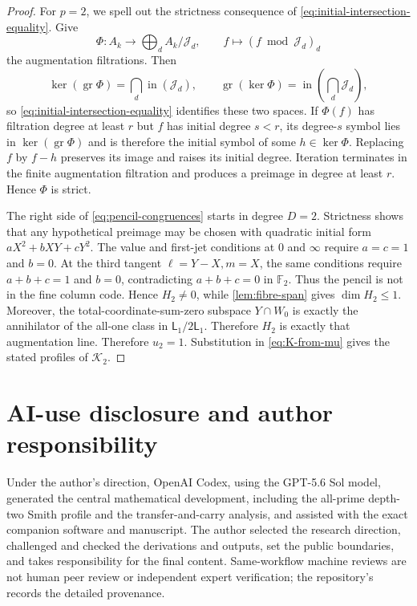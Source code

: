 \documentclass[12pt,a4paper]{article}
\theoremstyle{definition}
\newcommand{\F}{\mathbb F}
\newcommand{\LL}{\mathsf L}
\begin{document}
\begin{proof}
For $p=2$, we spell out the strictness consequence of
\eqref{eq:initial-intersection-equality}.  Give
\[
 \Phi:A_k\longrightarrow\bigoplus_d A_k/\mathcal J_d,
 \qquad f\longmapsto(f\bmod\mathcal J_d)_d
\]
the augmentation filtrations.  Then
\[
 \ker(\operatorname{gr}\Phi)=\bigcap_d\operatorname{in}(\mathcal J_d),
 \qquad
 \operatorname{gr}(\ker\Phi)
 =\operatorname{in}\!\left(\bigcap_d\mathcal J_d\right),
\]
so \eqref{eq:initial-intersection-equality} identifies these two spaces.
If $\Phi(f)$ has filtration degree at least $r$ but $f$ has initial degree
$s<r$, its degree-$s$ symbol lies in $\ker(\operatorname{gr}\Phi)$ and is
therefore the initial symbol of some $h\in\ker\Phi$.  Replacing $f$ by $f-h$
preserves its image and raises its initial degree.  Iteration terminates in
the finite augmentation filtration and produces a preimage in degree at
least $r$.  Hence $\Phi$ is strict.

The right side of \eqref{eq:pencil-congruences} starts in degree $D=2$.
Strictness shows that any hypothetical preimage may be chosen with quadratic
initial form $aX^2+bXY+cY^2$.  The value and first-jet conditions at $0$ and
$\infty$ require $a=c=1$ and $b=0$.  At the third tangent
$\ell=Y-X,m=X$, the same conditions require $a+b+c=1$ and $b=0$, contradicting
$a+b+c=0$ in $\F_2$.  Thus the pencil is not in the fine column code.  Hence
$H_2\ne0$, while \cref{lem:fibre-span} gives $\dim H_2\leq1$.  Moreover, the
total-coordinate-sum-zero subspace $Y\cap W_0$ is exactly the annihilator of
the all-one class in $\LL_1/2\LL_1$.  Therefore $H_2$ is exactly that
augmentation line.
Therefore $u_2=1$.  Substitution in \eqref{eq:K-from-mu} gives the stated
profiles of $\mathcal K_2$.
\end{proof}

\section*{AI-use disclosure and author responsibility}

Under the author's direction, OpenAI Codex, using the GPT-5.6 Sol model,
generated the central mathematical development, including the all-prime
depth-two Smith profile and the transfer-and-carry analysis, and assisted
with the exact companion software and manuscript.  The author selected the
research direction, challenged and checked the derivations and outputs, set
the public boundaries, and takes responsibility for the final content.
Same-workflow machine reviews are not human peer review or independent expert
verification; the repository's  records the detailed
provenance.

\printbibliography
\end{document}
